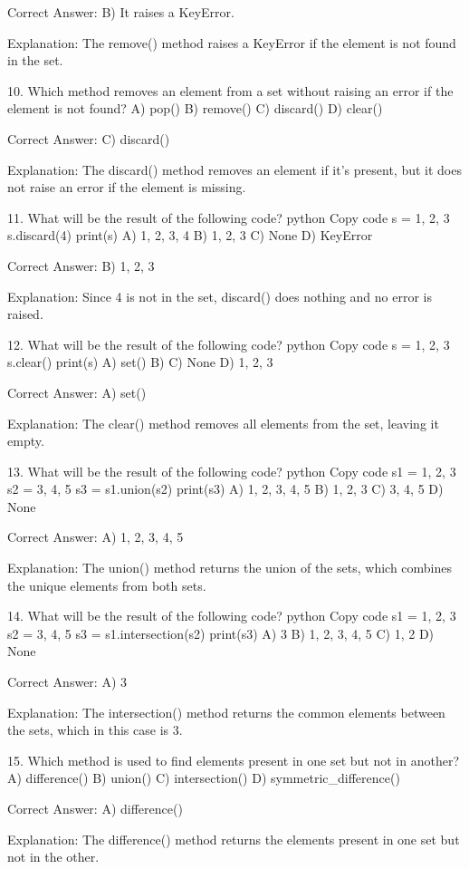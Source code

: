 Correct Answer: B) It raises a KeyError.

Explanation:
The remove() method raises a KeyError if the element is not found in the set.

10. Which method removes an element from a set without raising an error if the element is not found?
A) pop()
B) remove()
C) discard()
D) clear()

Correct Answer: C) discard()

Explanation:
The discard() method removes an element if it's present, but it does not raise an error if the element is missing.

11. What will be the result of the following code?
python
Copy code
s = {1, 2, 3}
s.discard(4)
print(s)
A) {1, 2, 3, 4}
B) {1, 2, 3}
C) None
D) KeyError

Correct Answer: B) {1, 2, 3}

Explanation:
Since 4 is not in the set, discard() does nothing and no error is raised.

12. What will be the result of the following code?
python
Copy code
s = {1, 2, 3}
s.clear()
print(s)
A) set()
B) {}
C) None
D) {1, 2, 3}

Correct Answer: A) set()

Explanation:
The clear() method removes all elements from the set, leaving it empty.

13. What will be the result of the following code?
python
Copy code
s1 = {1, 2, 3}
s2 = {3, 4, 5}
s3 = s1.union(s2)
print(s3)
A) {1, 2, 3, 4, 5}
B) {1, 2, 3}
C) {3, 4, 5}
D) None

Correct Answer: A) {1, 2, 3, 4, 5}

Explanation:
The union() method returns the union of the sets, which combines the unique elements from both sets.

14. What will be the result of the following code?
python
Copy code
s1 = {1, 2, 3}
s2 = {3, 4, 5}
s3 = s1.intersection(s2)
print(s3)
A) {3}
B) {1, 2, 3, 4, 5}
C) {1, 2}
D) None

Correct Answer: A) {3}

Explanation:
The intersection() method returns the common elements between the sets, which in this case is 3.

15. Which method is used to find elements present in one set but not in another?
A) difference()
B) union()
C) intersection()
D) symmetric_difference()

Correct Answer: A) difference()

Explanation:
The difference() method returns the elements present in one set but not in the other.

